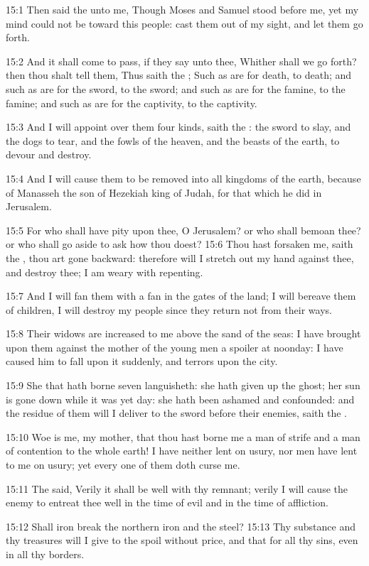 15:1 Then said the \LORD unto me, Though Moses and Samuel stood before me, yet my mind could not be toward this people: cast them out of my sight, and let them go forth.

15:2 And it shall come to pass, if they say unto thee, Whither shall we go forth? then thou shalt tell them, Thus saith the \LORD; Such as are for death, to death; and such as are for the sword, to the sword; and such as are for the famine, to the famine; and such as are for the captivity, to the captivity.

15:3 And I will appoint over them four kinds, saith the \LORD: the sword to slay, and the dogs to tear, and the fowls of the heaven, and the beasts of the earth, to devour and destroy.

15:4 And I will cause them to be removed into all kingdoms of the earth, because of Manasseh the son of Hezekiah king of Judah, for that which he did in Jerusalem.

15:5 For who shall have pity upon thee, O Jerusalem? or who shall bemoan thee? or who shall go aside to ask how thou doest?  15:6 Thou hast forsaken me, saith the \LORD, thou art gone backward: therefore will I stretch out my hand against thee, and destroy thee; I am weary with repenting.

15:7 And I will fan them with a fan in the gates of the land; I will bereave them of children, I will destroy my people since they return not from their ways.

15:8 Their widows are increased to me above the sand of the seas: I have brought upon them against the mother of the young men a spoiler at noonday: I have caused him to fall upon it suddenly, and terrors upon the city.

15:9 She that hath borne seven languisheth: she hath given up the ghost; her sun is gone down while it was yet day: she hath been ashamed and confounded: and the residue of them will I deliver to the sword before their enemies, saith the \LORD.

15:10 Woe is me, my mother, that thou hast borne me a man of strife and a man of contention to the whole earth! I have neither lent on usury, nor men have lent to me on usury; yet every one of them doth curse me.

15:11 The \LORD said, Verily it shall be well with thy remnant; verily I will cause the enemy to entreat thee well in the time of evil and in the time of affliction.

15:12 Shall iron break the northern iron and the steel?  15:13 Thy substance and thy treasures will I give to the spoil without price, and that for all thy sins, even in all thy borders.

